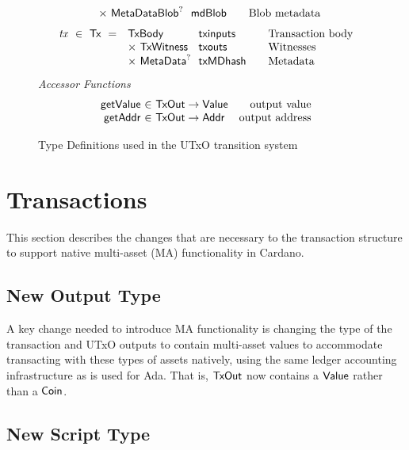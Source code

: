 \begin{figure*}[t!]
\begin{equation*}
\begin{array}{r@{~~}l@{~~}l@{\qquad}l}
      & \times ~\MetaDataBlob^? & \fun{mdBlob} & \text{Blob metadata}
    \end{array}
  \end{equation*}
  \begin{equation*}
    \begin{array}{r@{~~}l@{~~}l@{\qquad}l}
      \var{tx} ~\in~ \Tx ~=~
      & \TxBody & \fun{txinputs}& \text{Transaction body}\\
      &\times ~\TxWitness & \fun{txouts}& \text{Witnesses}\\
      & \times ~\MetaData^? & \fun{txMDhash} & \text{Metadata}
    \end{array}
  \end{equation*}
  \emph{Accessor Functions}
  \begin{equation*}
    \begin{array}{r@{~\in~}lr}
      \fun{getValue} & \TxOut \to \Value & \text{output value} \\
      \fun{getAddr} & \TxOut \to \Addr & \text{output address}
    \end{array}
  \end{equation*}
  \caption{Type Definitions used in the UTxO transition system}
  \label{fig:defs:utxo-shelley}
\end{figure*}

\section{Transactions}
\label{sec:transactions}

This section describes the changes that are necessary to the
transaction structure to support native multi-asset (MA) functionality in
Cardano.

\subsection*{New Output Type}

A key change needed to introduce MA functionality is changing the type of
the transaction and UTxO outputs to contain multi-asset values to accommodate
transacting with these types of assets natively, using the same ledger accounting
infrastructure as is used for Ada. That is,
$\mathsf{TxOut}$ now contains a $\mathsf{Value}$ rather than a $\mathsf{Coin}$.

\subsection*{New Script Type}


